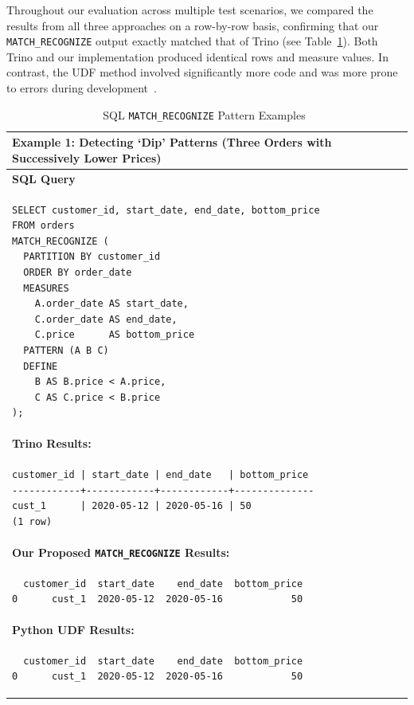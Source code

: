 \noindent Throughout our evaluation across multiple test scenarios, we
compared the results from all three approaches on a row-by-row basis,
confirming that our \texttt{MATCH\_RECOGNIZE} output exactly matched
that of Trino (see Table~\ref{tab:sql-match-recognize-examples}).  Both
Trino and our implementation produced identical rows and measure
values.  In contrast, the UDF method involved significantly more code
and was more prone to errors during development~\cite{Python_UDF}.

\begin{longtable}{|p{}|}
\caption{SQL \texttt{MATCH\_RECOGNIZE} Pattern Examples~\cite{monierashraf2025rowmatch}}
\label{tab:sql-match-recognize-examples}\\
\hline
\multicolumn{1}{|l|}{\parbox{0.93\textwidth}{\textbf{Example 1: Detecting `Dip' Patterns
(Three Orders with Successively Lower Prices)}}} \\
\hline
\textbf{SQL Query} \\
\begin{minipage}{0.90\textwidth}
\begin{verbatim}
SELECT customer_id, start_date, end_date, bottom_price
FROM orders
MATCH_RECOGNIZE (
  PARTITION BY customer_id
  ORDER BY order_date
  MEASURES
    A.order_date AS start_date,
    C.order_date AS end_date,
    C.price      AS bottom_price
  PATTERN (A B C)
  DEFINE
    B AS B.price < A.price,
    C AS C.price < B.price
);
\end{verbatim}
\end{minipage} \\
\hline
\textbf{Trino Results:} \\
\begin{minipage}{0.90\textwidth}
\begin{verbatim}
customer_id | start_date | end_date   | bottom_price
------------+------------+------------+--------------
cust_1      | 2020-05-12 | 2020-05-16 | 50
(1 row)
\end{verbatim}
\end{minipage} \\
\hline
\textbf{Our Proposed \texttt{MATCH\_RECOGNIZE} Results:} \\
\begin{minipage}{0.90\textwidth}
\begin{verbatim}
  customer_id  start_date    end_date  bottom_price
0      cust_1  2020-05-12  2020-05-16            50
\end{verbatim}
\end{minipage} \\
\hline
\textbf{Python UDF Results:} \\
\begin{minipage}{0.90\textwidth}
\begin{verbatim}
  customer_id  start_date    end_date  bottom_price
0      cust_1  2020-05-12  2020-05-16            50
\end{verbatim}
\end{minipage} \\
\hline
\end{longtable}

